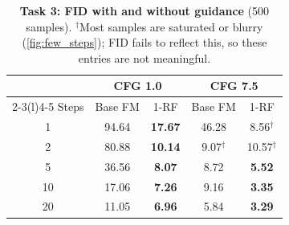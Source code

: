 \begin{table}[t]
  \centering
  \footnotesize
  \setlength{\tabcolsep}{4pt}
  \caption{\textbf{Task 3: FID with and without guidance} (500 samples). $^\dagger$Most samples are saturated or blurry (\cref{fig:few_steps}); FID fails to reflect this, so these entries are not meaningful.}
  \label{tab:task3_cfg}
  \begin{tabular}{@{}ccccc@{}}
    \toprule
    & \multicolumn{2}{c}{CFG 1.0} & \multicolumn{2}{c}{CFG 7.5} \\
    \cmidrule(lr){2-3}\cmidrule(l){4-5}
    Steps & Base FM & 1-RF & Base FM & 1-RF \\
    \midrule
    1  & 94.64 & \textbf{17.67} & 46.28 & 8.56$^\dagger$ \\
    2  & 80.88 & \textbf{10.14} & 9.07$^\dagger$ & 10.57$^\dagger$ \\
    5  & 36.56 & \textbf{8.07}  & 8.72 & \textbf{5.52} \\
    10 & 17.06 & \textbf{7.26}  & 9.16 & \textbf{3.35} \\
    20 & 11.05 & \textbf{6.96}  & 5.84 & \textbf{3.29} \\
    \bottomrule
  \end{tabular}
\end{table}
